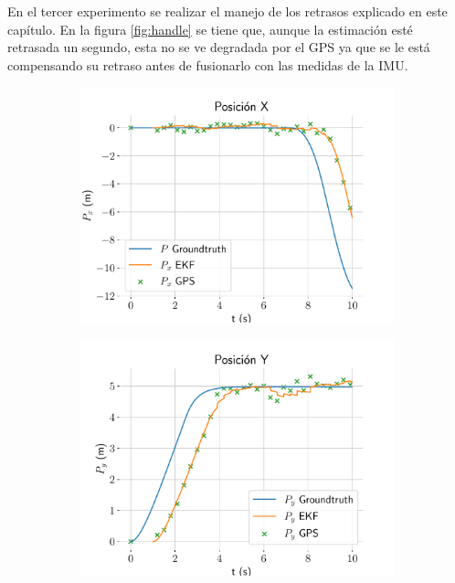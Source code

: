 En el tercer experimento se realizar el manejo de los retrasos explicado en este capítulo. En la figura \ref{fig:handle} se tiene que, aunque la estimación esté retrasada un segundo, esta no se ve degradada por el GPS ya que se le está compensando su retraso antes de fusionarlo con las medidas de la IMU. 

\begin{figure}	
	\centering
	\hspace*{-0.5cm}
	\begin{subfigure}[t]{0.49\textwidth}
		\centering
		\includegraphics[width=\textwidth]{estimador_px4/im_simu/handle_delay/x_t}
		\caption{}
		\label{fig:handle-xt}		
	\end{subfigure}
	\quad
	\begin{subfigure}[t]{0.49\textwidth}
		\centering
		\includegraphics[width=\textwidth]{estimador_px4/im_simu/handle_delay/y_t}

\end{subfigure}
\end{figure}
